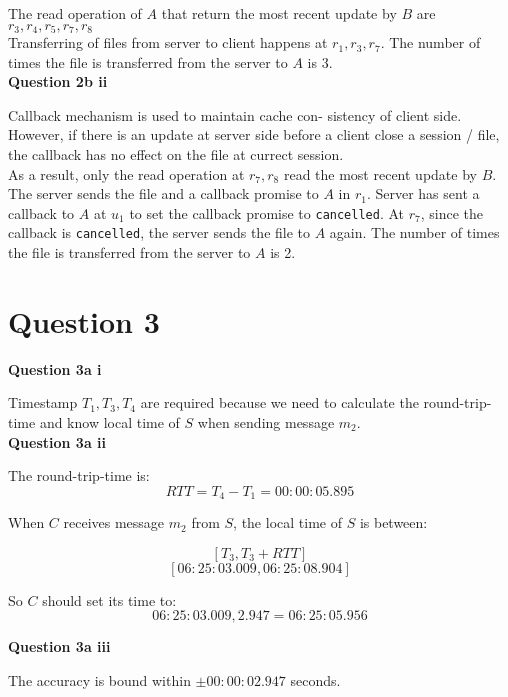\documentclass[11pt,a4paper]{report}
\begin{document}
\begin{multicols*}{2}
\noindent The read operation of $A$ that return the most recent update by $B$ are $r_3,r_4,r_5,r_7,r_8$\\

\noindent Transferring of files from server to client happens at $r_1,r_3,r_7$. The number of times the file is transferred from the server to $A$ is 3.\\

\noindent \textbf{Question 2b ii}

\noindent Callback mechanism is used to maintain cache con- sistency of client side. However, if there is an update at server side before a client close a session / file, the callback has no effect on the file at currect session. \\

\noindent As a result, only the read operation at $r_7,r_8$ read the most recent update by $B$. \\

\noindent The server sends the file and a callback promise to $A$ in $r_1$. Server has sent a callback to $A$ at $u_1$ to set the callback promise to \verb|cancelled|. At $r_7$, since the callback is \verb|cancelled|, the server sends the file to $A$ again. The number of times the file is transferred from the server to $A$ is 2.

\section{Question 3}

\noindent \textbf{Question 3a i}

\noindent Timestamp $T_1,T_3,T_4$ are required because we need to calculate the round-trip-time and know local time of $S$ when sending message $m_2$.\\

\noindent \textbf{Question 3a ii}

\noindent The round-trip-time is:
$$RTT = T_4 - T_1 = 00:00:05.895$$

\noindent When $C$ receives message $m_2$ from $S$, the local time of $S$ is between:

$$[T_3, T_3+RTT]$$
$$[06:25:03.009, 06:25:08.904]$$

\noindent So $C$ should set its time to:
$$06:25:03.009, 2.947 = 06:25:05.956$$

\noindent \textbf{Question 3a iii}

\noindent The accuracy is bound within $\pm 00:00:02.947$ seconds.\\


\end{multicols*}
\end{document}
